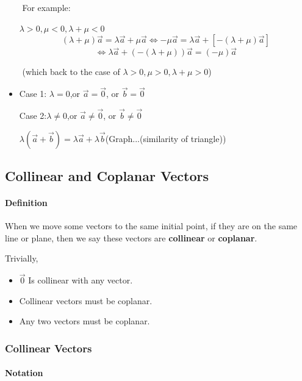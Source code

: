 \documentclass[11pt]{book}
\begin{document}
\begin{itemize}
​	For example: 

​	$\lambda >0 , \mu <0,\lambda +\mu <0 $ 
$$
(\lambda +\mu )\vec a = \lambda \vec a +\mu \vec a \iff -\mu \vec a  = \lambda \vec a +[-(\lambda +\mu )\vec a ]
$$
$$
\iff \lambda \vec  a +(-(\lambda + \mu ))\vec a  = (-\mu) \vec a
$$



​	(which back to the case of $\lambda >0 , \mu >0 ,\lambda + \mu >0$)



\item Case 1: $\lambda = 0$,or $\vec a = \vec 0$, or $\vec b= \vec 0 $

Case 2:$\lambda \neq 0$,or $\vec a \neq \vec 0$, or $\vec b\neq \vec 0 $

$\lambda( \vec  a + \vec  b) = \lambda \vec a +\lambda \vec b $(Graph...(similarity of triangle))


\end{itemize}

\subsection{Collinear and Coplanar Vectors}

\paragraph{Definition}

When we move some vectors to the same initial point, if they are on the same line or plane, then we say these vectors are \textbf{collinear }or \textbf{coplanar}. 

Trivially,

\begin{itemize}

\item $\vec 0 $ Is collinear with any vector. 
\item Collinear vectors must be coplanar.
\item Any two vectors must be coplanar.

\end{itemize}


\subsubsection{ Collinear Vectors}


\paragraph{Notation}
\end{document}
